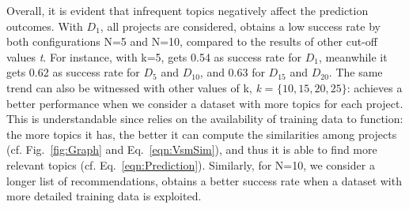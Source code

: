 
Overall, it is evident that infrequent topics negatively affect the prediction outcomes. With $D_{1}$, \ie all projects are considered, \TF obtains a low success rate by both configurations N=5 and N=10, compared to the results of other cut-off values \emph{t}. For instance, with k=5, \TFa gets 0.54 as success rate for $D_{1}$, meanwhile it gets 0.62 as success rate for $D_{5}$ and $D_{10}$, and 0.63 for $D_{15}$ and $D_{20}$. The same trend can also be witnessed with other values of k, \ie \emph{k} = $\{10, 15, 20, 25\}$: \TFa achieves a better performance when we consider a dataset with more topics for each project. This is understandable since \TFa relies on the availability of training data to function: the more topics it has, the better it can compute the similarities among projects (cf. Fig.~\ref{fig:Graph} and Eq.~\ref{eqn:VsmSim}), and thus it is able to find more relevant topics (cf. Eq.~\ref{eqn:Prediction}). Similarly, for N=10, \ie we consider a longer list of recommendations, \TFa obtains a better success rate when a dataset with more detailed training data is exploited. 

